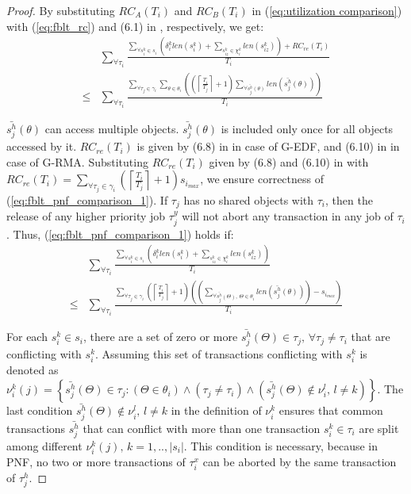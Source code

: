\documentclass[a4paper,english]{article}
\newtheorem{proof}{Proof}
\begin{document}
\begin{proof}\normalfont
By substituting $RC_{A}(T_{i})$ and $RC_{B}(T_{i})$ in (\ref{eq:utilization comparison})
with (\ref{eq:fblt_rc}) and (6.1) in \cite{shambake_phd_proposal}, 
respectively, we get:
\begin{eqnarray}
 & \sum_{\forall\tau_{i}}\frac{\sum_{\forall s_{i}^{k}\in s_{i}}\left(\delta_{i}^{k}len(s_{i}^{k})+\sum_{s_{iz}^{k}\in\chi_{i}^{k}}len(s_{iz}^{k})\right)+RC_{re}(T_{i})}{T_{i}}\label{eq:fblt_pnf_comparison_1}\\
\le & \sum_{\forall\tau_{i}}\frac{\sum_{\forall\tau_{j}\in\gamma_{i}}\sum_{\theta\in\theta_{i}}\left(\left(\left\lceil \frac{T_{i}}{T_{j}}\right\rceil +1\right)\sum_{\forall\bar{s_{j}^{h}}(\theta)}len\left(\bar{s_{j}^{h}}(\theta)\right)\right)}{T_{i}}\nonumber 
\end{eqnarray}


$\bar{s_{j}^{h}}(\theta)$ can access multiple objects. $\bar{s_{j}^{h}}(\theta)$
is included only once for all objects accessed by it. $RC_{re}(T_{i})$
is given by (6.8) in \cite{shambake_phd_proposal} in case of G-EDF,
and (6.10) in \cite{shambake_phd_proposal} in case of G-RMA. Substituting $RC_{re}(T_{i})$ given by (6.8) and (6.10) in \cite{shambake_phd_proposal} with $RC_{re}(T_{i})=\sum_{\forall\tau_{j}\in\gamma_{i}}\left(\left\lceil \frac{T_{i}}{T_{j}}\right\rceil +1\right)s_{i_{max}}$, we ensure correctness of (\ref{eq:fblt_pnf_comparison_1}). If $\tau_{j}$ has no shared objects with $\tau_{i}$, then the release of
any higher priority job $\tau_{j}^{y}$ will not abort any transaction
in any job of $\tau_{i}$. Thus, (\ref{eq:fblt_pnf_comparison_1}) holds
if:
\begin{eqnarray}
 & \sum_{\forall\tau_{i}}\frac{\sum_{\forall s_{i}^{k}\in s_{i}}\left(\delta_{i}^{k}len(s_{i}^{k})+\sum_{s_{iz}^{k}\in\chi_{i}^{k}}len(s_{iz}^{k})\right)}{T_{i}}\label{eq:fblt_pnf_comparison_1-1}\\
\le & \sum_{\forall\tau_{i}}\frac{\sum_{\forall\tau_{j}\in\gamma_{i}}\left(\left\lceil \frac{T_{i}}{T_{j}}\right\rceil +1\right)\left(\left(\sum_{\forall\bar{s_{j}^{h}}(\Theta),\,\Theta\in\theta_{i}}len\left(\bar{s_{j}^{h}}(\theta)\right)\right)-s_{i_{max}}\right)}{T_{i}}\nonumber 
\end{eqnarray}

For each $s_{i}^{k}\in s_{i}$, there are a set of zero or more $\bar{s_{j}^{h}}(\Theta)\in\tau_{j},\,\forall\tau_{j}\ne\tau_{i}$
that are conflicting with $s_{i}^{k}$. Assuming this set of 
transactions conflicting with $s_{i}^{k}$ is denoted as $\nu_{i}^{k}(j)=\left\{ \bar{s_{j}^{h}}(\Theta)\in\tau_{j}:\left(\Theta\in\theta_{i}\right)\wedge\left(\tau_{j}\ne\tau_{i}\right)\wedge\left(\bar{s_{j}^{h}}(\Theta)\not\in\nu_{i}^{l},\, l\ne k\right)\right\} $.
The last condition $\bar{s_{j}^{h}}(\Theta)\not\in\nu_{i}^{l},\, l\ne k$
in the definition of $\nu_{i}^{k}$ ensures that common transactions
$\bar{s_{j}^{h}}$ that can conflict with more than one transaction
$s_{i}^{k}\in\tau_{i}$ are split among different $\nu_{i}^{k}(j),\, k=1,..,|s_{i}|$.
This condition is necessary, because in PNF, no two or more transactions of $\tau_{i}^{x}$ can be aborted by the same transaction of $\tau_{j}^{h}$.


\end{proof}
\end{document}
